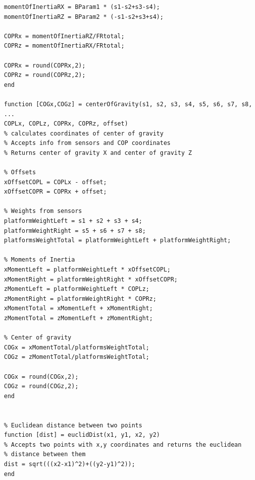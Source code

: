 \documentclass[twoside]{ctuthesis}
\theoremstyle{plain}
\theoremstyle{definition}
\theoremstyle{note}
\begin{document}
\begin{lstlisting}[style=Matlab-editor]
momentOfInertiaRX = BParam1 * (s1-s2+s3-s4);
momentOfInertiaRZ = BParam2 * (-s1-s2+s3+s4);

COPRx = momentOfInertiaRZ/FRtotal;
COPRz = momentOfInertiaRX/FRtotal;

COPRx = round(COPRx,2);
COPRz = round(COPRz,2);
end

function [COGx,COGz] = centerOfGravity(s1, s2, s3, s4, s5, s6, s7, s8, ...
COPLx, COPLz, COPRx, COPRz, offset)
% calculates coordinates of center of gravity
% Accepts info from sensors and COP coordinates
% Returns center of gravity X and center of gravity Z

% Offsets
xOffsetCOPL = COPLx - offset;
xOffsetCOPR = COPRx + offset;

% Weights from sensors
platformWeightLeft = s1 + s2 + s3 + s4;
platformWeightRight = s5 + s6 + s7 + s8;
platformsWeightTotal = platformWeightLeft + platformWeightRight;

% Moments of Inertia
xMomentLeft = platformWeightLeft * xOffsetCOPL;
xMomentRight = platformWeightRight * xOffsetCOPR;
zMomentLeft = platformWeightLeft * COPLz;
zMomentRight = platformWeightRight * COPRz;
xMomentTotal = xMomentLeft + xMomentRight;
zMomentTotal = zMomentLeft + zMomentRight;

% Center of gravity
COGx = xMomentTotal/platformsWeightTotal;
COGz = zMomentTotal/platformsWeightTotal;

COGx = round(COGx,2);
COGz = round(COGz,2);
end


% Euclidean distance between two points
function [dist] = euclidDist(x1, y1, x2, y2)
% Accepts two points with x,y coordinates and returns the euclidean 
% distance between them
dist = sqrt(((x2-x1)^2)+((y2-y1)^2));
end

\end{lstlisting}
\end{document}
